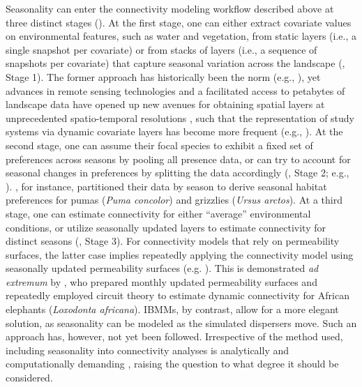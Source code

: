 \documentclass[../FinalThesis.tex]{subfiles}
\begin{document}
Seasonality can enter the connectivity modeling workflow described above at
three distinct stages (). At the first stage, one can
either extract covariate values on environmental features, such as water and
vegetation, from static layers (i.e., a single snapshot per covariate) or from
stacks of layers (i.e., a sequence of snapshots per covariate) that capture
seasonal variation across the landscape (, Stage 1).
The former approach has historically been the norm (e.g., \citealp{Elliot.2014,
Brennan.2020}), yet advances in remote sensing technologies and a facilitated
access to petabytes of landscape data have opened up new avenues for obtaining
spatial layers at unprecedented spatio-temporal resolutions \citep{Toth.2016,
Rumiano.2020}, such that the representation of study systems via dynamic
covariate layers has become more frequent (e.g., \citealp{Osipova.2019,
Kaszta.2021}). At the second stage, one can assume their focal species to
exhibit a fixed set of preferences across seasons by pooling all presence data,
or can try to account for seasonal changes in preferences by splitting the data
accordingly (, Stage 2; e.g., \citealp{Fortin.2005,
Manly.2007, Cushman.2010, Zeller.2020}). \citet{Chetkiewicz.2009}, for instance,
partitioned their data by season to derive seasonal habitat preferences for
pumas (\textit{Puma concolor}) and grizzlies (\textit{Ursus arctos}). At a third
stage, one can estimate connectivity for either ``average'' environmental
conditions, or utilize seasonally updated layers to estimate connectivity for
distinct seasons (, Stage 3). For connectivity models
that rely on permeability surfaces, the latter case implies repeatedly applying
the connectivity model using seasonally updated permeability surfaces (e.g.
\citealp{Osipova.2019, Zeller.2020, Kaszta.2021, Ciudad.2021}). This is
demonstrated \textit{ad extremum} by \citet{Kaszta.2021}, who prepared monthly
updated permeability surfaces and repeatedly employed circuit theory to estimate
dynamic connectivity for African elephants (\textit{Loxodonta africana}). IBMMs,
by contrast, allow for a more elegant solution, as seasonality can be modeled as
the simulated dispersers move. Such an approach has, however, not yet been
followed. Irrespective of the method used, including seasonality into
connectivity analyses is analytically and computationally demanding
\citep{Bishop-Taylor.2018}, raising the question to what degree it should be
considered.
\end{document}
